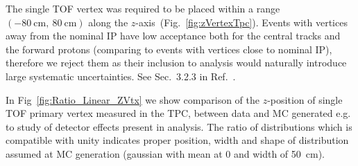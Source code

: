 The single TOF vertex was required to be placed within a range $(-80~\text{cm},~80~\text{cm})$ along the $z$-axis~(Fig.~\ref{fig:zVertexTpc}). Events with vertices away from the nominal IP have low acceptance both for the central tracks and the forward protons (comparing to events with vertices close to nominal IP), therefore we reject them as their inclusion to analysis would naturally introduce large systematic uncertainties. See Sec.~3.2.3 in Ref.~\cite{supplementaryNote}.

In Fig~\ref{fig:Ratio_Linear_ZVtx} we show comparison of the $z$-position of single TOF primary vertex measured in the TPC, between data and MC generated e.g. to study of detector effects present in analysis. The ratio of distributions which is compatible with unity indicates proper position, width and shape of distribution assumed at MC generation (gaussian with mean at 0 and width of 50~cm).


